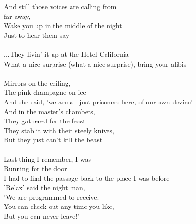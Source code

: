 {And still those voices are calling from\\
far away,\\
Wake you up in the middle of the night\\
Just to hear them say\\
\\
...They livin' it up at the Hotel California\\
What a nice surprise (what a nice surprise), bring your alibis\\
\\
Mirrors on the ceiling,\\
The pink champagne on ice\\
And she said, 'we are all just prisoners here, of our own device'\\
And in the master's chambers,\\
They gathered for the feast\\
They stab it with their steely knives,\\
But they just can't kill the beast\\
\\
Last thing I remember, I was\\
Running for the door\\
I had to find the passage back to the place I was before\\
'Relax' said the night man,\\
'We are programmed to receive.\\
You can check out any time you like,\\
But you can never leave!'
}


